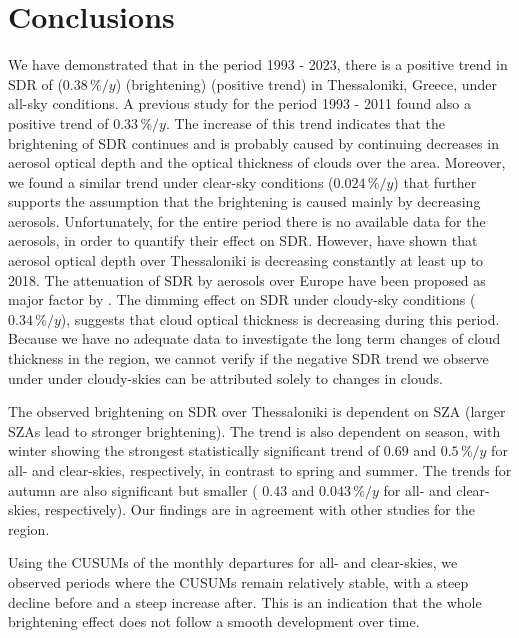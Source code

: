 \documentclass[applsci,article,submit,moreauthors,pdftex]{Definitions/mdpi}
\begin{document}
\hypertarget{conclusions}{%
\section{Conclusions}\label{conclusions}}

We have demonstrated that in the period 1993 - 2023, there is a positive
trend in SDR of (\(0.38\,\%/y\)) (brightening) (positive trend) in
Thessaloniki, Greece, under all-sky conditions. A previous study
\citep{Bais2013} for the period 1993 - 2011 found also a positive trend
of \(0.33\,\%/y\). The increase of this trend indicates that the
brightening of SDR continues and is probably caused by continuing
decreases in aerosol optical depth and the optical thickness of clouds
over the area. Moreover, we found a similar trend under clear-sky
conditions (\(0.024\,\%/y\)) that further supports the assumption that
the brightening is caused mainly by decreasing aerosols. Unfortunately,
for the entire period there is no available data for the aerosols, in
order to quantify their effect on SDR. However, \citet{Siomos2020} have
shown that aerosol optical depth over Thessaloniki is decreasing
constantly at least up to 2018. The attenuation of SDR by aerosols over
Europe have been proposed as major factor by \citet{Wild2021}. The
dimming effect on SDR under cloudy-sky conditions (\(0.34\,\%/y\)),
suggests that cloud optical thickness is decreasing during this period.
Because we have no adequate data to investigate the long term changes of
cloud thickness in the region, we cannot verify if the negative SDR
trend we observe under under cloudy-skies can be attributed solely to
changes in clouds.

The observed brightening on SDR over Thessaloniki is dependent on SZA
(larger SZAs lead to stronger brightening). The trend is also dependent
on season, with winter showing the strongest statistically significant
trend of \(0.69\) and \(0.5\,\%/y\) for all- and clear-skies,
respectively, in contrast to spring and summer. The trends for autumn
are also significant but smaller ( \(0.43\) and \(0.043\,\%/y\) for all-
and clear-skies, respectively). Our findings are in agreement with other
studies for the region.

Using the CUSUMs of the monthly departures for all- and clear-skies, we
observed periods where the CUSUMs remain relatively stable, with a steep
decline before and a steep increase after. This is an indication that
the whole brightening effect does not follow a smooth development over
time.
\end{document}
